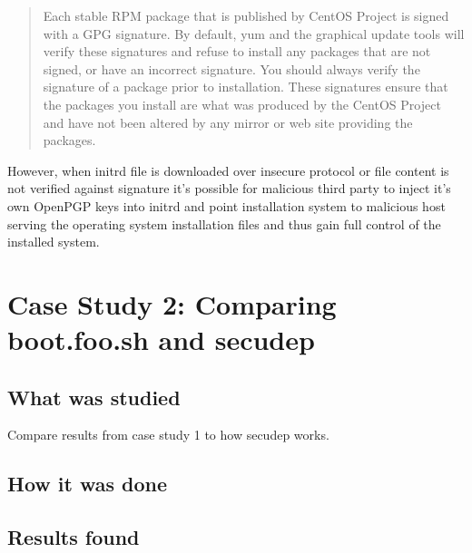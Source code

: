 \begin{quote}
Each stable RPM package that is published by CentOS Project is signed
with a GPG signature. By default, yum and the graphical update tools
will verify these signatures and refuse to install any packages that
are not signed, or have an incorrect signature. You should always
verify the signature of a package prior to installation. These
signatures ensure that the packages you install are what was produced
by the CentOS Project and have not been altered by any mirror or
web site providing the packages.
\end{quote}

However, when initrd file is downloaded over insecure protocol or file
content is not verified against signature it's possible for malicious
third party to inject it's own OpenPGP keys into initrd and point
installation system to malicious host serving the operating system
installation files and thus gain full control of the installed system.


\section{Case Study 2: Comparing boot.foo.sh and secudep}
\label{sec:casestudy2}

\subsection{What was studied}

Compare results from case study 1 to how secudep works.

\subsection{How it was done}


\subsection{Results found}

